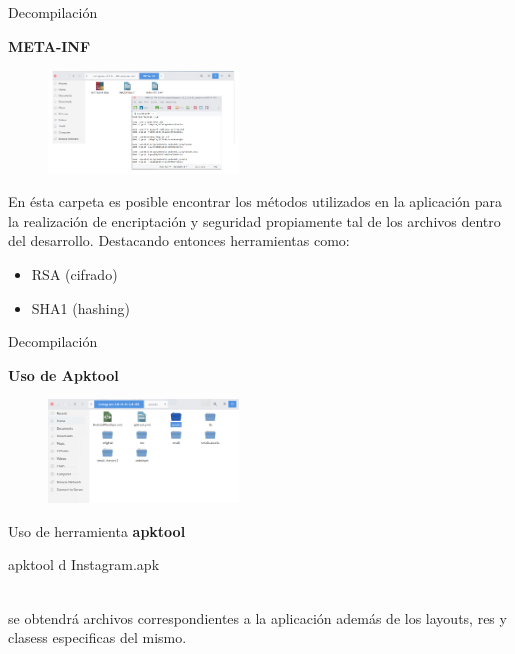 \begin{frame}[t,fragile]{Decompilación}

\textbf{META-INF}


\begin{figure} 
\vspace{2pt}
  \begin{center}
    \includegraphics[width=0.45\textwidth]{meta-inf2.png}
    \label{fig:databaseUserTable}
  \end{center}
  \vspace{2pt}
\end{figure} 

\bigskip

En ésta carpeta es posible encontrar los métodos utilizados en la aplicación para la realización de encriptación y seguridad propiamente tal de los archivos dentro del desarrollo. Destacando entonces herramientas como:

\begin{itemize}
    \item RSA (cifrado)
    \item SHA1 (hashing)
\end{itemize}


\end{frame}




\begin{frame}[t,fragile]{Decompilación}

\textbf{Uso de Apktool}

\begin{figure} 
\vspace{2pt}
  \begin{center}
    \includegraphics[width=0.45\textwidth]{apktool.png}
    \label{fig:databaseUserTable}
  \end{center}
  \vspace{2pt}
\end{figure} 

\bigskip

Uso de herramienta \textbf{apktool} 
\begin{center}
    apktool d Instagram.apk
\end{center}
 \\
 
 se obtendrá archivos correspondientes a la aplicación además de los layouts, res y clasess especificas del mismo.

\end{frame}

